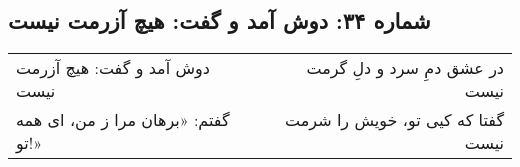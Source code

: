 \begin{center}
\section*{شماره ۳۴: دوش آمد و گفت: هیچ آزرمت نیست}
\label{sec:034}
\begin{longtable}{l p{0.5cm} r}
دوش آمد و گفت: هیچ آزرمت نیست
&&
در عشق دمِ سرد و دلِ گرمت نیست
\\
گفتم: «برهان مرا ز من، ای همه تو!»
&&
گفتا که کیی تو، خویش را شرمت نیست
\\
\end{longtable}
\end{center}
